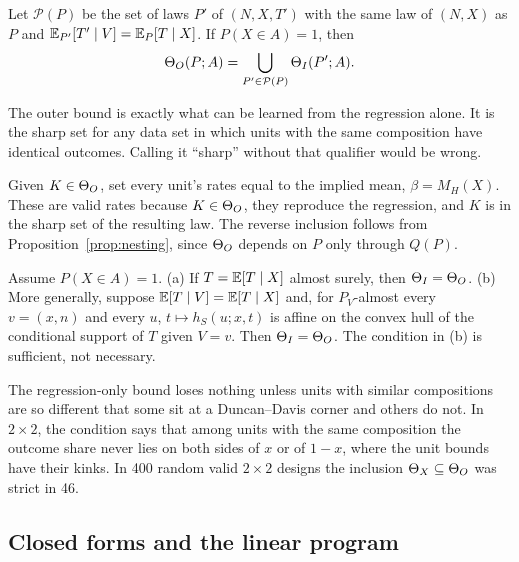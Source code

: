 \begin{proposition}\label{prop:sharpreg}
Let $\mathcal P(P)$ be the set of laws $P'$ of $(N,X,T')$ with the same law of
$(N,X)$ as $P$ and $\mathbb E_{P'}[T'\mid V]=\mathbb E_P[T\mid X]$. If $P(X\in A)=1$, then
\[
\Theta_O(P;A)=\bigcup_{P'\in\mathcal P(P)}\Theta_I(P';A).
\]
\end{proposition}
\begin{reading}
The outer bound is exactly what can be learned from the regression alone. It is
the sharp set for any data set in which units with the same composition have
identical outcomes. Calling it ``sharp'' without that qualifier would be wrong.
\end{reading}
\begin{sketch}
Given $K\in\Theta_O$, set every unit's rates equal to the implied mean, $\beta=M_H(X)$.
These are valid rates because $K\in\Theta_O$, they reproduce the regression, and $K$
is in the sharp set of the resulting law. The reverse inclusion follows from
Proposition~\ref{prop:nesting}, since $\Theta_O$ depends on $P$ only through $Q(P)$.
\end{sketch}

\begin{proposition}\label{prop:IequalsO}
Assume $P(X\in A)=1$. (a) If $T=\mathbb E[T\mid X]$ almost surely, then $\Theta_I=\Theta_O$.
(b) More generally, suppose $\mathbb E[T\mid V]=\mathbb E[T\mid X]$ and, for $P_V$-almost every
$v=(x,n)$ and every $u$, $t\mapsto h_S(u;x,t)$ is affine on the convex hull of the
conditional support of $T$ given $V=v$. Then $\Theta_I=\Theta_O$. The condition in (b) is
sufficient, not necessary.
\end{proposition}
\begin{reading}
The regression-only bound loses nothing unless units with similar compositions
are so different that some sit at a Duncan--Davis corner and others do not. In
$2\times2$, the condition says that among units with the same composition the
outcome share never lies on both sides of $x$ or of $1-x$, where the unit bounds
have their kinks. In 400 random valid $2\times2$ designs the inclusion
$\Theta_X\subseteq\Theta_O$ was strict in 46.
\end{reading}

\subsection{Closed forms and the linear program}

